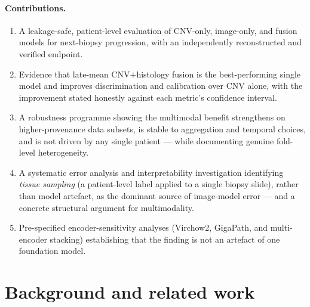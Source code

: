 \paragraph{Contributions.}
\begin{enumerate}
  \item A leakage-safe, patient-level evaluation of CNV-only, image-only, and
    fusion models for next-biopsy progression, with an independently
    reconstructed and verified endpoint.
  \item Evidence that late-mean CNV$+$histology fusion is the best-performing
    single model and improves discrimination and calibration over CNV alone,
    with the improvement stated honestly against each metric's confidence
    interval.
  \item A robustness programme showing the multimodal benefit strengthens on
    higher-provenance data subsets, is stable to aggregation and temporal
    choices, and is not driven by any single patient --- while documenting
    genuine fold-level heterogeneity.
  \item A systematic error analysis and interpretability investigation
    identifying \emph{tissue sampling} (a patient-level label applied to a
    single biopsy slide), rather than model artefact, as the dominant source of
    image-model error --- and a concrete structural argument for multimodality.
  \item Pre-specified encoder-sensitivity analyses (Virchow2, GigaPath, and
    multi-encoder stacking) establishing that the finding is not an artefact of
    one foundation model.
\end{enumerate}

\section{Background and related work}
\label{sec:background}

